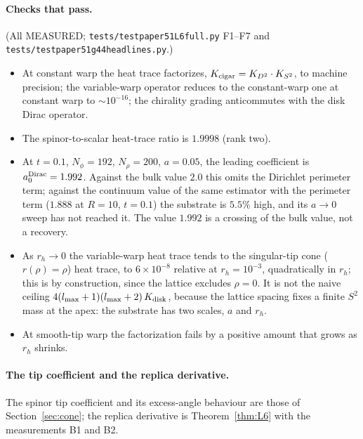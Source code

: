 \documentclass[11pt,a4paper]{article}
\theoremstyle{plain}
\theoremstyle{definition}
\renewcommand{\_}{\textunderscore\allowbreak}
\begin{document}
\paragraph{Checks that pass.} (All MEASURED;
\texttt{tests/test\_paper51\_L6\_full.py} F1--F7 and
\texttt{tests/test\_paper51\_g44\_headlines.py}.)
\begin{itemize}
  \item At constant warp the heat trace factorizes,
        $K_{\rm cigar} = K_{D^2}\cdot K_{S^2}$, to machine precision;
        the variable-warp operator reduces to the constant-warp one at
        constant warp to $\sim 10^{-16}$; the chirality grading
        anticommutes with the disk Dirac operator.
  \item The spinor-to-scalar heat-trace ratio is $1.9998$ (rank two).
  \item At $t = 0.1$, $N_\phi = 192$, $N_\rho = 200$, $a = 0.05$, the
        leading coefficient is $a_0^{\rm Dirac} = 1.992$. Against the bulk
        value $2.0$ this omits the Dirichlet perimeter term; against the
        continuum value of the same estimator with the perimeter term
        ($1.888$ at $R = 10$, $t = 0.1$) the substrate is $5.5\%$ high,
        and its $a \to 0$ sweep has not reached it. The value $1.992$ is a
        crossing of the bulk value, not a recovery.
  \item As $r_h \to 0$ the variable-warp heat trace tends to the
        singular-tip cone ($r(\rho) = \rho$) heat trace, to $6\times10^{-8}$
        relative at $r_h = 10^{-3}$, quadratically in $r_h$; this is by
        construction, since the lattice excludes $\rho = 0$. It is not the
        naive ceiling $4(l_{\max}+1)(l_{\max}+2)\,K_{\rm disk}$, because
        the lattice spacing fixes a finite $S^2$ mass at the apex: the
        substrate has two scales, $a$ and $r_h$.
  \item At smooth-tip warp the factorization fails by a positive amount
        that grows as $r_h$ shrinks.
\end{itemize}

\paragraph{The tip coefficient and the replica derivative.} The spinor
tip coefficient and its excess-angle behaviour are those of
Section~\ref{sec:cone}; the replica derivative is Theorem~\ref{thm:L6} with
the measurements B1 and B2.
\end{document}
